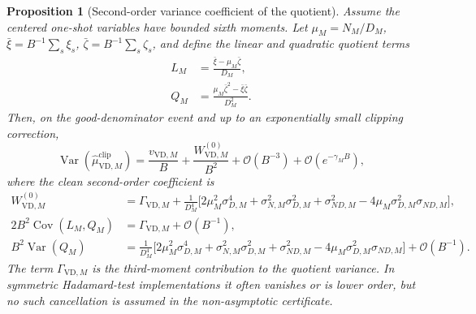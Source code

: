 \documentclass[11pt]{article}
\newtheorem{proposition}{Proposition}
\newcommand{\Var}{\operatorname{Var}}
\newcommand{\Cov}{\operatorname{Cov}}
\newcommand{\1}{\mathbf{1}}
\newcommand{\OO}{\mathcal{O}}
\begin{document}
\begin{proposition}[Second-order variance coefficient of the quotient]
\label{prop:vd_second_order_variance_v11}
Assume the centered one-shot variables have bounded sixth moments.  Let \(\mu_M=N_M/D_M\), \(\bar\xi=B^{-1}\sum_s\xi_s\), \(\bar\zeta=B^{-1}\sum_s\zeta_s\), and define the linear and quadratic quotient terms
\begin{align}
    L_M&=\frac{\bar\xi-\mu_M\bar\zeta}{D_M},\\
    Q_M&=\frac{\mu_M\bar\zeta^2-\bar\xi\bar\zeta}{D_M^2}.
\end{align}
Then, on the good-denominator event and up to an exponentially small clipping correction,
\begin{equation}
    \Var\!\left(\widehat\mu_{\mathrm{VD},M}^{\mathrm{clip}}\right)
    =\frac{v_{\mathrm{VD},M}}{B}
     +\frac{W_{\mathrm{VD},M}^{(0)}}{B^2}
     +\OO(B^{-3})+\OO(e^{-\gamma_M B}),
    \label{eq:second_order_variance_expansion_v11}
\end{equation}
where the clean second-order coefficient is
\begin{align}
    W_{\mathrm{VD},M}^{(0)}
    &=\Gamma_{\mathrm{VD},M}
      +\frac{1}{D_M^4}\Big[
      2\mu_M^2\sigma_{D,M}^4
      +\sigma_{N,M}^2\sigma_{D,M}^2
      +\sigma_{ND,M}^2
      -4\mu_M\sigma_{D,M}^2\sigma_{ND,M}
      \Big],                                      \label{eq:second_order_W0_v13}\\
    2B^2\Cov(L_M,Q_M)
    &=\Gamma_{\mathrm{VD},M}+\OO(B^{-1}),          \label{eq:third_moment_gamma_v13}\\
    B^2\Var(Q_M)
    &=\frac{1}{D_M^4}\Big[
      2\mu_M^2\sigma_{D,M}^4
      +\sigma_{N,M}^2\sigma_{D,M}^2
      +\sigma_{ND,M}^2
      -4\mu_M\sigma_{D,M}^2\sigma_{ND,M}
      \Big]+\OO(B^{-1}).
      \label{eq:second_order_Q_variance_v11}
\end{align}
The term \(\Gamma_{\mathrm{VD},M}\) is the third-moment contribution to the quotient variance.  In symmetric Hadamard-test implementations it often vanishes or is lower order, but no such cancellation is assumed in the non-asymptotic certificate.
\end{proposition}
\end{document}
